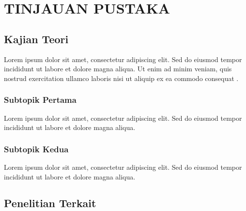 \chapter{TINJAUAN PUSTAKA}


\section{Kajian Teori}


Lorem ipsum dolor sit amet, consectetur adipiscing elit. Sed do eiusmod tempor incididunt ut labore et dolore magna aliqua. Ut enim ad minim veniam, quis nostrud exercitation ullamco laboris nisi ut aliquip ex ea commodo consequat \citep{referensi1}.

\subsection{Subtopik Pertama}


Lorem ipsum dolor sit amet, consectetur adipiscing elit. Sed do eiusmod tempor incididunt ut labore et dolore magna aliqua.

\subsection{Subtopik Kedua}


Lorem ipsum dolor sit amet, consectetur adipiscing elit. Sed do eiusmod tempor incididunt ut labore et dolore magna aliqua.

\section{Penelitian Terkait}


